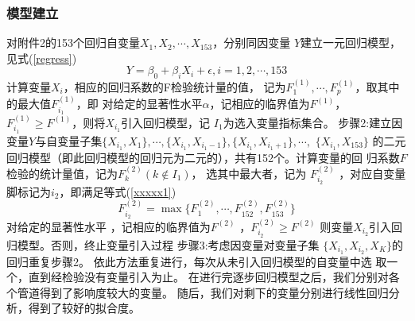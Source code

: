         \subsubsection{模型建立}
            对附件2的153个回归自变量$X_1,X_2,\cdots,X_{153}$，分别同因变量
            $Y$建立一元回归模型，见式(\ref{regress})
            \begin{equation}
                Y = \beta_0 + \beta_iX_i + \epsilon, i = 1,2,\cdots, 153
                \label{regress}
            \end{equation}
            计算变量$X_i$，相应的回归系数的F检验统计量的值，
            记为$F_1^{(1)},\cdots,F_p^{(1)}$，取其中的最大值$F_{i_1}^{(1)}$，即
            对给定的显著性水平$\alpha$，记相应的临界值为$F^(1)$，
            $F_{i_1}^{(1)} \geqslant F^{(1)}$，则将$X_{i_1}$引入回归模型，记
            $I_1$为选入变量指标集合。
            步骤2:建立因变量$Y$与自变量子集$\{X_{i_1},X_1\},\cdots,
            \{X_{i_1},X_{i_1-1}\},\{X_{i_1},X_{i_1+1}\},\cdots,$
            $\{X_{i_1},X_{153}\}$
            的二元回归模型（即此回归模型的回归元为二元的），共有152个。计算变量的回
            归系数$F$检验的统计量值，记为$F_k^{(2)}(k\notin I_1)$，
            选其中最大者，记为 $F_{i_2}^{(2)}$
            ，对应自变量脚标记为$i_2$，即满足等式(\ref{xxxxx1})
            \begin{equation}
                F_{i_2}^{(2)} = \max \{F_1^{(2)},\cdots,F_{152}^{(2)},F_{153}^{(2)} \}
                \label{xxxxx1}
            \end{equation}
            对给定的显著性水平 ，记相应的临界值为$F^{(2)}$ ，$F_{i_2}^{(2)} \geqslant F^{(2)}$ 
            则变量$X_{i_2}$引入回归模型。否则，终止变量引入过程
            步骤3:考虑因变量对变量子集  $\{X_{i_1},X_{i_2},X_K\}$的回归重复步骤2。
            依此方法重复进行，每次从未引入回归模型的自变量中选
            取一个，直到经检验没有变量引入为止。
            在进行完逐步回归模型之后，我们分别对各个管道得到了影响度较大的变量。
            随后，我们对剩下的变量分别进行线性回归分析，得到了较好的拟合度。
